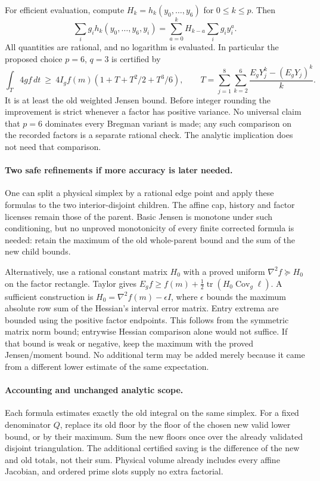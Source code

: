 For efficient evaluation, compute $H_k=h_k(y_0,\ldots,y_6)$ for
$0\le k\le p$. Then
\[
 \sum_i g_i h_k(y_0,\ldots,y_6,y_i)
 =\sum_{a=0}^{k}H_{k-a}\sum_i g_i y_i^a.
\]
All quantities are rational, and no logarithm is evaluated. In
particular the proposed choice $p=6$, $q=3$ is certified by
\begin{equation}\label{eq:sixth-curvature-moment-six-exp-three}
 \int_T4g f\,dt\ \ge\
 4I_g f(m)\left(1+T+T^2/2+T^3/6\right),\qquad
 T=\sum_{j=1}^{8}\sum_{k=2}^{6}
                  \frac{E_gY_j^k-(E_gY_j)^k}{k}.
\end{equation}
It is at least the old weighted Jensen bound. Before integer rounding
the improvement is strict whenever a factor has positive variance.
No universal claim that $p=6$ dominates every Bregman variant is made;
any such comparison on the recorded factors is a separate rational
check. The analytic implication does not need that comparison.

\paragraph{Two safe refinements if more accuracy is later needed.}
One can split a physical simplex by a rational edge point and apply
these formulas to the two interior-disjoint children. The affine cap,
history and factor licenses remain those of the parent. Basic Jensen
is monotone under such conditioning, but no unproved monotonicity of
every finite corrected formula is needed: retain the maximum of the
old whole-parent bound and the sum of the new child bounds.

Alternatively, use a rational constant matrix $H_0$ with a proved
uniform $\nabla^2 f\succeq H_0$ on the factor rectangle. Taylor gives
$E_gf\ge f(m)+\tfrac12\operatorname{tr}(H_0\operatorname{Cov}_g\ell)$.
A sufficient construction is $H_0=\nabla^2 f(m)-\epsilon I$, where
$\epsilon$ bounds the maximum absolute row sum of the Hessian's
interval error matrix. Entry extrema are bounded using the positive
factor endpoints. This follows from the symmetric matrix norm bound;
entrywise Hessian comparison alone would not suffice. If that bound
is weak or negative, keep the maximum with the proved Jensen/moment
bound. No additional term may be added merely because it came from
a different lower estimate of the same expectation.

\paragraph{Accounting and unchanged analytic scope.}
Each formula estimates exactly the old integral on the same simplex.
For a fixed denominator $Q$, replace its old floor by the floor of
the chosen new valid lower bound, or by their maximum. Sum the new
floors once over the already validated disjoint triangulation. The
additional certified saving is the difference of the new and old
totals, not their sum. Physical volume already includes every affine
Jacobian, and ordered prime slots supply no extra factorial.

